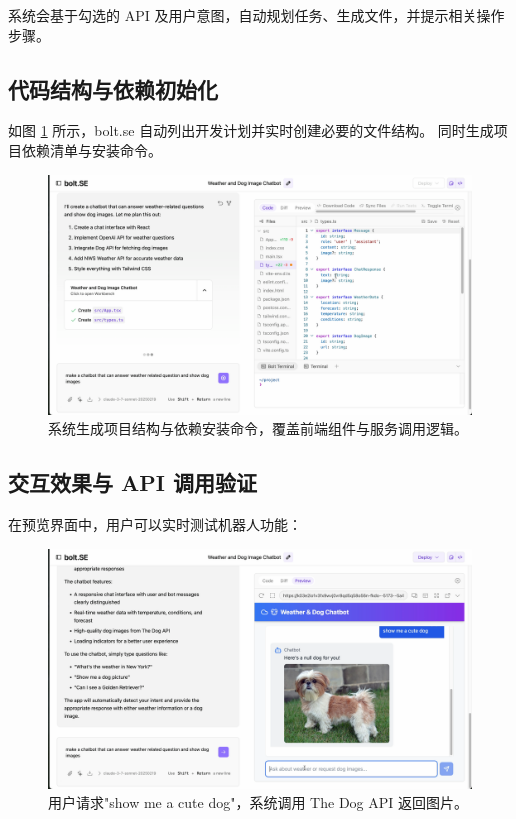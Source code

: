 系统会基于勾选的 API 及用户意图，自动规划任务、生成文件，并提示相关操作步骤。

\subsection{代码结构与依赖初始化}

如图 \ref{fig:demo_plan} 所示，bolt.se 自动列出开发计划并实时创建必要的文件结构。
同时生成项目依赖清单与安装命令。

\begin{figure}[htbp]
  \centering
  \includegraphics[width=\textwidth]{figures/screenshots/api-actions/demo_plan_files.png}
  \caption{系统生成项目结构与依赖安装命令，覆盖前端组件与服务调用逻辑。}
  \label{fig:demo_plan}
\end{figure}

\subsection{交互效果与 API 调用验证}

在预览界面中，用户可以实时测试机器人功能：

\begin{figure}[htbp]
  \centering
  \includegraphics[width=\textwidth]{figures/screenshots/api-actions/demo_dog_preview.png}
  \caption{用户请求"show me a cute dog"，系统调用 The Dog API 返回图片。}
  \label{fig:demo_dog}
\end{figure}

